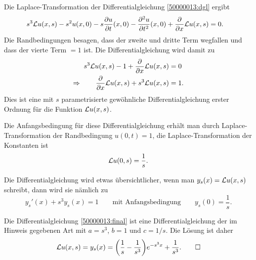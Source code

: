 \begin{loesung}
\begin{teilaufgaben}
\item
Die Laplace-Transformation der Differentialgleichung \eqref{50000013:dgl}
ergibt
\begin{align*}
s^3 {\cal L}u(x,s)
-s^2 u(x,0)
-s\frac{\partial u}{\partial t}(x,0)
-\frac{\partial^2 u}{\partial t^2}(x,0)
+
\frac{\partial}{\partial x}{\cal L}u(x,s)
&=
0.
\end{align*}
Die Randbedingungen besagen, dass der zweite und dritte Term wegfallen
und dass der vierte Term $=1$ ist.
Die Differentialgleichung wird damit zu
\begin{align*}
s^3 {\cal L}u(x,s)
-1
+
\frac{\partial}{\partial x}{\cal L}u(x,s)
&=
0
\\
\Rightarrow\qquad
\frac{\partial}{\partial x}{\cal L}u(x,s)
+
s^3 {\cal L}u(x,s)
&=
1.
\end{align*}
Dies ist eine mit $s$ parametrisierte gewöhnliche Differentialgleichung
erster Ordnung für die Funktion ${\cal L}u(x,s)$.

Die Anfangsbedingung für diese Differentialgleichung erhält man durch
Laplace-Transformation der Randbedingung $u(0,t)=1$, die Laplace-Transformation
der Konstanten ist
\[
{\cal L}u(0,s) = \frac1s.
\]

Die Differentialgleichung wird etwas übersichtlicher, wenn man
$y_s(x) = {\cal L}u(x,s)$ schreibt, dann wird sie nämlich zu
\begin{equation}
y_s'(x) + s^3 y_s(x)=1
\qquad\text{mit Anfangsbedingung}\qquad
y_s(0)=\frac1s.
\label{50000013:final}
\end{equation}

\item
Die Differentialgleichung \eqref{50000013:final} ist eine Differentialgleichung
der im Hinweis gegebenen Art mit $a=s^3$, $b=1$ und $c=1/s$.
Die Lösung ist daher
\[
{\cal L}u(x,s)
=
y_s(x)
=
\biggl(\frac1s-\frac1{s^3}\biggr)e^{-s^3x} + \frac{1}{s^3}.
\qedhere
\]
\end{teilaufgaben}
\end{loesung}

